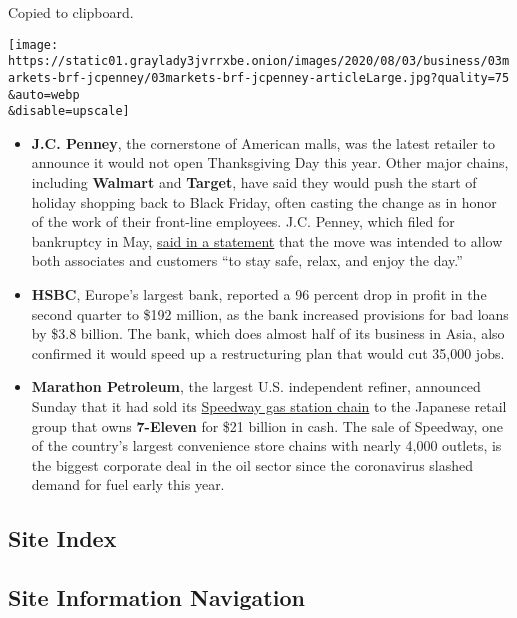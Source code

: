 Copied to clipboard.

\texttt{[image: https://static01.graylady3jvrrxbe.onion/images/2020/08/03/business/03markets-brf-jcpenney/03markets-brf-jcpenney-articleLarge.jpg?quality=75\\\&auto=webp\\\&disable=upscale]}

\begin{itemize}
\item
  \textbf{J.C. Penney}, the cornerstone of American malls, was the
  latest retailer to announce it would not open Thanksgiving Day this
  year. Other major chains, including \textbf{Walmart} and
  \textbf{Target}, have said they would push the start of holiday
  shopping back to Black Friday, often casting the change as in honor of
  the work of their front-line employees. J.C. Penney, which filed for
  bankruptcy in May,
  \href{https://companyblog.jcpnewsroom.com/2020/08/03/jcpenney-to-close-stores-on-thanksgiving-day-2020/}{said
  in a statement} that the move was intended to allow both associates
  and customers ``to stay safe, relax, and enjoy the day.''
\item
  \textbf{HSBC}, Europe's largest bank, reported a 96 percent drop in
  profit in the second quarter to \$192 million, as the bank increased
  provisions for bad loans by \$3.8 billion. The bank, which does almost
  half of its business in Asia, also confirmed it would speed up a
  restructuring plan that would cut 35,000 jobs.
\item
  \textbf{Marathon Petroleum}, the largest U.S. independent refiner,
  announced Sunday that it had sold its
  \href{https://www.nytimes3xbfgragh.onion/2020/08/02/business/marathon-petroleum-speedway-7-11.html}{Speedway
  gas station chain} to the Japanese retail group that owns
  \textbf{7-Eleven} for \$21 billion in cash. The sale of Speedway, one
  of the country's largest convenience store chains with nearly 4,000
  outlets, is the biggest corporate deal in the oil sector since the
  coronavirus slashed demand for fuel early this year.
\end{itemize}

\hypertarget{site-index}{%
\subsection{Site Index}\label{site-index}}

\hypertarget{site-information-navigation}{%
\subsection{Site Information
Navigation}\label{site-information-navigation}}

